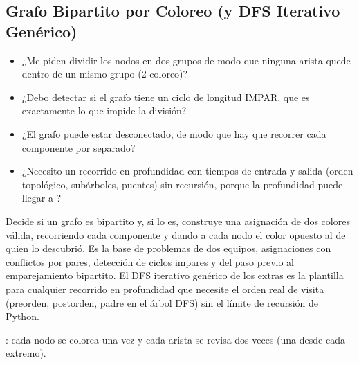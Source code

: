 \subsection{Grafo Bipartito por Coloreo (y DFS Iterativo Genérico)}
\label{alg:4-12}


\begin{itemize}
\item ¿Me piden dividir los nodos en dos grupos de modo que ninguna arista quede dentro de un mismo grupo (2-coloreo)?
\item ¿Debo detectar si el grafo tiene un ciclo de longitud IMPAR, que es exactamente lo que impide la división?
\item ¿El grafo puede estar desconectado, de modo que hay que recorrer cada componente por separado?
\item ¿Necesito un recorrido en profundidad con tiempos de entrada y salida (orden topológico, subárboles, puentes) sin recursión, porque la profundidad puede llegar a ?
\end{itemize}

 Decide si un grafo es bipartito y, si lo es, construye una asignación de dos colores válida, recorriendo cada componente y dando a cada nodo el color opuesto al de quien lo descubrió. Es la base de problemas de dos equipos, asignaciones con conflictos por pares, detección de ciclos impares y del paso previo al emparejamiento bipartito. El DFS iterativo genérico de los extras es la plantilla para cualquier recorrido en profundidad que necesite el orden real de visita (preorden, postorden, padre en el árbol DFS) sin el límite de recursión de Python.

 : cada nodo se colorea una vez y cada arista se revisa dos veces (una desde cada extremo).

